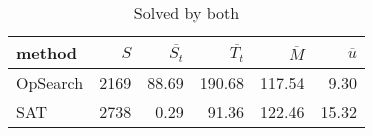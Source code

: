 \begin{table}[htbp]
\centering
\begingroup\small
\begin{tabular}{lrrrrr}
  \hline
method & $S$ & $\overline{S_t}$ & $\overline{T_t}$ & $\overline{M}$ & $\overline{u}$ \\ 
  \hline
OpSearch & 2169 & 88.69 & 190.68 & 117.54 & 9.30 \\ 
  SAT & 2738 & 0.29 & 91.36 & 122.46 & 15.32 \\ 
   \hline
\end{tabular}
\endgroup
\caption{Solved by both} 
\label{tab:summary_both}
\end{table}
